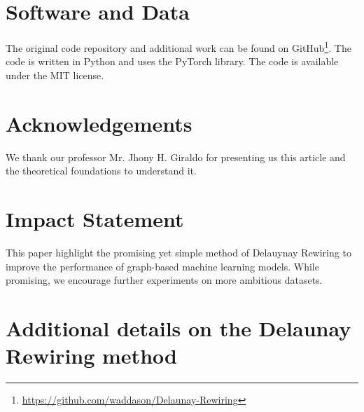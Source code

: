 \documentclass{article}
\theoremstyle{plain}
\theoremstyle{definition}
\theoremstyle{remark}
\begin{document}

\section*{Software and Data}

The original code repository and additional work can be found on GitHub\footnote{ 
\url{https://github.com/waddason/Delaunay-Rewiring}}.
The code is written in Python and uses the PyTorch library. The code is available under the MIT license.

\section*{Acknowledgements}

We thank our professor Mr. Jhony H. Giraldo for presenting us this article and 
the theoretical foundations to understand it.

\section*{Impact Statement}

This paper highlight the promising yet simple method of Delauynay Rewiring to 
improve the performance of graph-based machine learning models.
While promising, we encourage further experiments on more ambitious datasets.


\clearpage




\newpage
\appendix
\onecolumn


\section{Additional details on the Delaunay Rewiring method}
\end{document}
